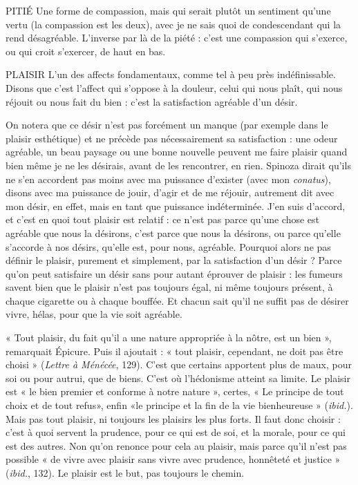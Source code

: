 PITIÉ Une forme de compassion, mais qui serait plutôt un sentiment
qu’une vertu (la compassion est les deux), avec je ne sais quoi de
condescendant qui la rend désagréable. L’inverse par là de la piété : c'est une
compassion qui s'exerce, ou qui croit s'exercer, de haut en bas.

PLAISIR L'un des affects fondamentaux, comme tel à peu près indéfinissable.
Disons que c’est l’affect qui s'oppose à la douleur, celui qui
nous plaît, qui nous réjouit ou nous fait du bien : c’est la satisfaction agréable
d’un désir.

On notera que ce désir n’est pas forcément un manque (par exemple dans
le plaisir esthétique) et ne précède pas nécessairement sa satisfaction : une
odeur agréable, un beau paysage ou une bonne nouvelle peuvent me faire
plaisir quand bien même je ne les désirais, avant de les rencontrer, en rien.
Spinoza dirait qu’ils ne s’en accordent pas moins avec ma puissance d'exister
(avec mon {\it conatus}), disons avec ma puissance de jouir, d’agir et de me
réjouir, autrement dit avec mon désir, en effet, mais en tant que puissance
indéterminée. J'en suis d’accord, et c’est en quoi tout plaisir est relatif : ce
n’est pas parce qu’une chose est agréable que nous la désirons, c’est parce que
nous la désirons, ou parce qu’elle s’accorde à nos désirs, qu’elle est, pour
nous, agréable. Pourquoi alors ne pas définir le plaisir, purement et simplement,
par la satisfaction d’un désir ? Parce qu’on peut satisfaire un désir sans
pour autant éprouver de plaisir : les fumeurs savent bien que le plaisir n’est
pas toujours égal, ni même toujours présent, à chaque cigarette ou à chaque
bouffée. Et chacun sait qu’il ne suffit pas de désirer vivre, hélas, pour que la
vie soit agréable.

« Tout plaisir, du fait qu’il a une nature appropriée à la nôtre, est un bien »,
remarquait Épicure. Puis il ajoutait : « tout plaisir, cependant, ne doit pas être
choisi » ({\it Lettre à Ménécée}, 129). C’est que certains apportent plus de maux,
pour soi ou pour autrui, que de biens. C’est où l’hédonisme atteint sa limite.
Le plaisir est « le bien premier et conforme à notre nature », certes, « Le principe
de tout choix et de tout refus», enfin «le principe et la fin de la vie
bienheureuse » ({\it ibid.}). Mais pas tout plaisir, ni toujours les plaisirs les plus
forts. Il faut donc choisir : c’est à quoi servent la prudence, pour ce qui est de
soi, et la morale, pour ce qui est des autres. Non qu’on renonce pour cela au
plaisir, mais parce qu’il n’est pas possible « de vivre avec plaisir sans vivre avec
prudence, honnêteté et justice » ({\it ibid.}, 132). Le plaisir est le but, pas toujours
le chemin.

